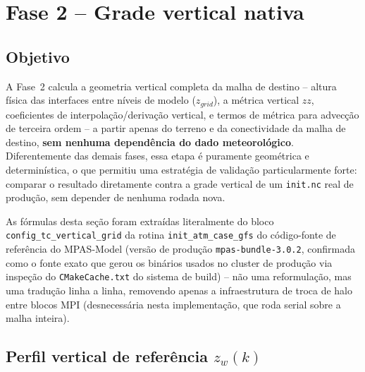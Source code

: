 \chapter{Fase 2 -- Grade vertical nativa}
\label{cap:fase2}

\section{Objetivo}

A Fase~2 calcula a geometria vertical completa da malha de destino --
altura física das interfaces entre níveis de modelo ($z_{grid}$), a
métrica vertical $zz$, coeficientes de interpolação/derivação vertical, e
termos de métrica para advecção de terceira ordem -- a partir apenas do
terreno e da conectividade da malha de destino, \textbf{sem nenhuma
dependência do dado meteorológico}. Diferentemente das demais fases, essa
etapa é puramente geométrica e determinística, o que permitiu uma
estratégia de validação particularmente forte: comparar o resultado
diretamente contra a grade vertical de um \texttt{init.nc} real de
produção, sem depender de nenhuma rodada nova.

As fórmulas desta seção foram extraídas literalmente do bloco
\texttt{config\_tc\_vertical\_grid} da rotina \texttt{init\_atm\_case\_gfs}
do código-fonte de referência do MPAS-Model (versão de produção
\texttt{mpas-bundle-3.0.2}, confirmada como o fonte exato que gerou os
binários usados no cluster de produção via inspeção do
\texttt{CMakeCache.txt} do sistema de build) -- não uma reformulação, mas
uma tradução linha a linha, removendo apenas a infraestrutura de troca de
halo entre blocos MPI (desnecessária nesta implementação, que roda serial
sobre a malha inteira).

\section{Perfil vertical de referência $z_w(k)$}
\label{sec:zw}

